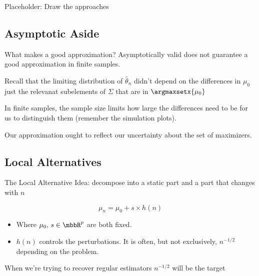 \documentclass[aspectratio=169, professionalfonts]{beamer}
\begin{document}




\begin{frame}{Placeholder: Draw the approaches}
\end{frame}

\subsection{Asymptotic Aside}

\begin{frame}{What makes a good approximation?}
	Asymptotically valid does not guarantee a good approximation in finite
	samples.

	\vfill


	Recall that the limiting distribution of $\widehat{\theta}_n$ didn't depend on
	the differences in $\mu_0$ just the relevanat subelements of $\Sigma$ that are in $\argmaxsetx{\mu_0}$


	\vfill
	In finite samples, the sample size limits how large the differences
	need to be for us to distinguish them (remember the simulation plots).

	\vfill

	Our approximation ought to reflect our uncertainty about the set
	of 	maximizers.
\end{frame}

\subsection{Local Alternatives}
\begin{frame}{The Local Alternative}
	Idea: decompose into a static part and a part that changes with $n$

	$$\mu_n = \mu_0 + s \times h(n)$$
	\begin{itemize}
		\item Where $\mu_0, \,s \in \mbbR^{p}$ are both fixed.
		      \vfill
		\item $h(n)$ controls the perturbations. It is often, but not
		      exclusively, $n^{-1/2}$ depending on the problem.
	\end{itemize}
	\vfill

	When we're trying to recover regular estimators $n^{-1/2}$ will be the target

\end{frame}
\end{document}
